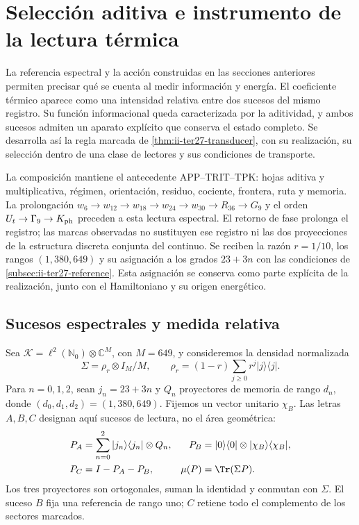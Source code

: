 \section{Selección aditiva e instrumento de la lectura térmica}
\label{sec:ii-aditiva-instrumento}

La referencia espectral y la acción construidas en las secciones anteriores
permiten precisar qué se cuenta al medir información y energía. El coeficiente
térmico aparece como una intensidad relativa entre dos sucesos del mismo
registro. Su función informacional queda caracterizada por la aditividad, y
ambos sucesos admiten un aparato explícito que conserva el estado completo.
Se desarrolla así la regla marcada de
\ref{thm:ii-ter27-transducer}, con su realización, su selección dentro de una
clase de lectores y sus condiciones de transporte.

La composición mantiene el antecedente APP--TRIT--TPK: hojas aditiva y
multiplicativa, régimen, orientación, residuo, cociente, frontera, ruta y
memoria. La prolongación
$w_6\to w_{12}\to w_{18}\to w_{24}\to w_{30}\to R_{36}\to G_9$
y el orden $U_t\to\Gamma_9\to K_{\rm ph}$ preceden a esta lectura
espectral. El retorno de fase prolonga el registro; las marcas observadas
no sustituyen ese registro ni las dos proyecciones de la estructura discreta
conjunta del continuo. Se reciben la razón $r=1/10$, los rangos
$(1,380,649)$ y su asignación a los grados $23+3n$ con las condiciones de
\ref{subsec:ii-ter27-reference}. Esta asignación se conserva como parte
explícita de la realización, junto con el Hamiltoniano y su origen energético.

\subsection{Sucesos espectrales y medida relativa}
\label{subsec:ii-tins-eventos}

Sea $\mathcal K=\ell^2(\mathbb N_0)\otimes\mathbb C^M$, con $M=649$,
y consideremos la densidad normalizada
\begin{equation}
 \Sigma=\rho_r\otimes I_M/M,\qquad
 \rho_r=(1-r)\sum_{j\ge0}r^j|j\rangle\langle j|.
 \label{eq:ii-tins-sigma}
\end{equation}
Para $n=0,1,2$, sean $j_n=23+3n$ y $Q_n$ proyectores de memoria de rango
$d_n$, donde $(d_0,d_1,d_2)=(1,380,649)$. Fijemos un vector unitario $\chi_B$.
Las letras $A,B,C$ designan aquí sucesos de lectura, no el área geométrica:
\begin{align}
 P_A&=\sum_{n=0}^2|j_n\rangle\langle j_n|\otimes Q_n,&
 P_B&=|0\rangle\langle0|\otimes|\chi_B\rangle\langle \chi_B|,
 \nonumber\\
 P_C&=I-P_A-P_B,& \mu(P)&=\Tr(\Sigma P).
 \label{eq:ii-tins-marks}
\end{align}
Los tres proyectores son ortogonales, suman la identidad y conmutan con
$\Sigma$. El suceso $B$ fija una referencia de rango uno; $C$ retiene todo
el complemento de los sectores marcados.

